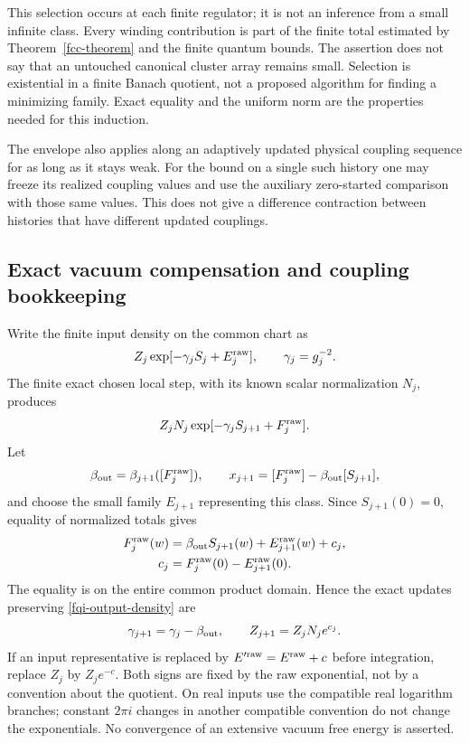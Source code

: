 \documentclass[11pt]{article}
\theoremstyle{remark}
\begin{document}
This selection occurs at each finite regulator; it is not
an inference from a small infinite class. Every winding
contribution is part of the finite total estimated by
Theorem~\ref{fcc-theorem} and the finite quantum bounds.
The assertion does not say that an untouched canonical
cluster array remains small. Selection is existential in
a finite Banach quotient, not a proposed algorithm for
finding a minimizing family. Exact equality and the uniform
norm are the properties needed for this induction.

The envelope also applies along an adaptively updated physical
coupling sequence for as long as it stays weak. For the bound
on a single such history one may freeze its realized coupling
values and use the auxiliary zero-started comparison with those
same values. This does not give a difference contraction
between histories that have different updated couplings.

\subsection{Exact vacuum compensation and coupling bookkeeping}
\label{fqi-vacuum-section}

Write the finite input density on the common chart as
\begin{equation}
 Z_j\exp[-\gamma_jS_j+E_j^{\rm raw}],\qquad
 \gamma_j=g_j^{-2}.
 \label{fqi-input-density}
\end{equation}
The finite exact chosen local step, with its known scalar
normalization $N_j$, produces
\begin{equation}
 Z_jN_j\exp[-\gamma_jS_{j+1}+F_j^{\rm raw}].
 \label{fqi-output-density}
\end{equation}
Let
\[
 \beta_{\rm out}=\beta_{j+1}([F_j^{\rm raw}]),\qquad
 x_{j+1}=[F_j^{\rm raw}]-\beta_{\rm out}[S_{j+1}],
\]
and choose the small family $E_{j+1}$ representing this class.
Since $S_{j+1}(0)=0$, equality of normalized totals gives
\begin{align}
 F_j^{\rm raw}(w)
   &=\beta_{\rm out}S_{j+1}(w)
                       +E_{j+1}^{\rm raw}(w)+c_j,\notag\\
 c_j&=F_j^{\rm raw}(0)-E_{j+1}^{\rm raw}(0).
 \label{fqi-constant-compensation}
\end{align}
The equality is on the entire common product domain. Hence
the exact updates preserving \eqref{fqi-output-density} are
\begin{equation}
 \gamma_{j+1}=\gamma_j-\beta_{\rm out},\qquad
 Z_{j+1}=Z_jN_j e^{c_j}.
 \label{fqi-vacuum-update}
\end{equation}
If an input representative is replaced by
$E'^{\rm raw}=E^{\rm raw}+c$ before integration, replace
$Z_j$ by $Z_je^{-c}$. Both signs are fixed by the raw
exponential, not by a convention about the quotient.
On real inputs use the compatible real logarithm branches;
constant $2\pi i$ changes in another compatible convention
do not change the exponentials. No convergence of an extensive
vacuum free energy is asserted.
\end{document}
